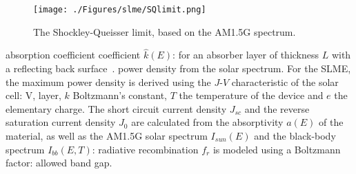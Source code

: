 \begin{refsection}
\begin{figure}[!htp]  
\centering 
\texttt{[image: ./Figures/slme/SQlimit.png]} 
\caption{\label{slme:fig-SQlimit} The Shockley-Queisser limit, based on the 
AM1.5G spectrum.} 
\end{figure} 
 
% 
absorption coefficient 
coefficient $\hat{k}(E)$: 
for an absorber layer of thickness $L$ with a reflecting back 
surface~\cite{Green1981}.  
% 
power density from the solar spectrum. For the SLME, the maximum power density 
is derived using the $J$-$V$ characteristic of the solar cell: 
V, 
layer, $k$ Boltzmann's constant, $T$ the temperature of the device and $e$ the 
elementary charge. The short circuit current density $J_{sc}$ and the reverse 
saturation current density $J_0$ are calculated from the absorptivity $a(E)$ 
of the material, as well as the AM1.5G solar spectrum $I_{sun}(E)$ and the 
black-body spectrum $I_{bb}(E,T)$: 
radiative recombination $f_r$ is modeled using a Boltzmann factor: 
allowed band gap.  
 

\end{refsection}
